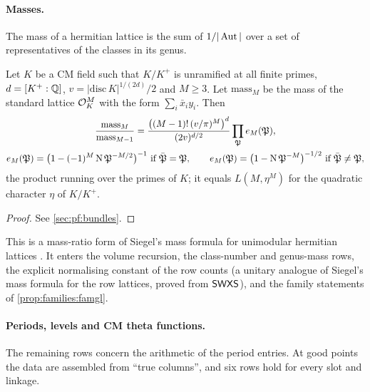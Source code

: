 \paragraph{Masses.}
The mass of a hermitian lattice is the sum of $1/|\operatorname{Aut}|$ over a set of representatives of the classes in its
genus.

\begin{proposition}\Fmark\label{prop:families:mass}
Let $K$ be a CM field such that $K/K^+$ is unramified at all finite primes, $d=[K^+:\mathbb{Q}]$,
$v=|\mathrm{disc}\,K|^{1/(2d)}/2$ and $M\ge3$. Let $\mathrm{mass}_M$ be the mass of the standard lattice
$\mathcal{O}_K^M$ with the form $\sum_i\bar x_iy_i$. Then
\begin{gather*}
\frac{\mathrm{mass}_M}{\mathrm{mass}_{M-1}}=\frac{\bigl((M-1)!\,(v/\pi)^M\bigr)^{d}}{(2v)^{d/2}}
\prod_{\mathfrak P}e_M(\mathfrak P),\\
e_M(\mathfrak P)=\bigl(1-(-1)^M\Nm\mathfrak P^{-M/2}\bigr)^{-1}\ \text{if }\bar{\mathfrak P}=\mathfrak P,\qquad
e_M(\mathfrak P)=\bigl(1-\Nm\mathfrak P^{-M}\bigr)^{-1/2}\ \text{if }\bar{\mathfrak P}\ne\mathfrak P,
\end{gather*}
the product running over the primes of $K$; it equals $L(M,\eta^M)$ for the quadratic character $\eta$ of
$K/K^+$.
\end{proposition}
\begin{proof}See \cref{sec:pf:bundles}.
\end{proof}


This is a mass-ratio form of Siegel's mass formula for unimodular hermitian lattices
\cite{Siegel1935,Prasad1989,GanHankeYu2001}. It enters the volume recursion, the class-number and genus-mass
rows, the explicit normalising constant of the row counts (a unitary analogue of Siegel's mass formula for the
row lattices, proved from $\mathsf{SWXS}$), and the family statements of \cref{prop:families:famgl}.

\paragraph{Periods, levels and CM theta functions.}
The remaining rows concern the arithmetic of the period entries. At good points the data are assembled from
``true columns'', and six rows hold for every slot and linkage.

